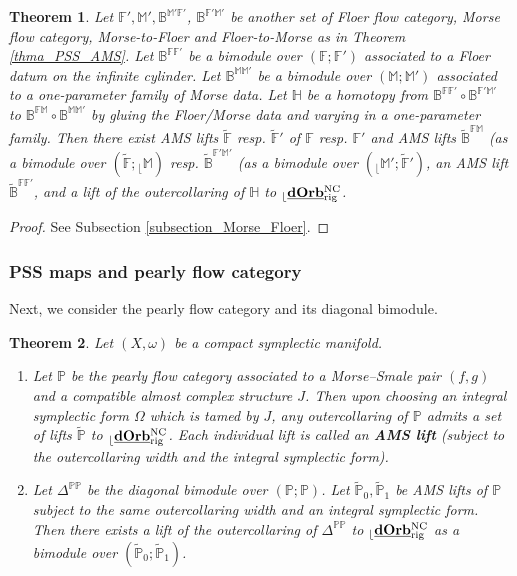 \documentclass[reqno, 10pt]{amsart}
\numberwithin{equation}{section}
\numberwithin{equation}{section}
\newtheorem{thm}{Theorem}[section]
\theoremstyle{definition}
\theoremstyle{remark}
\newcommand{\mb}{\mathbb}
\renewcommand{\outer}{{}_{\lfloor}}
\newcommand{\uds}[1]{\underline{\smash{#1}}}
\begin{document}
\begin{thm}\label{thm126}
Let ${\mb F}', {\mb M}', \mb{B}^{\mb{M}'\mb{F}'}$, $\mb{B}^{\mb{F}'\mb{M}'}$ be another set of Floer flow category, Morse flow category, Morse-to-Floer and Floer-to-Morse as in Theorem \ref{thma_PSS_AMS}. Let $\mb{B}^{\mb{FF}'}$ be a bimodule over $(\mb{F}; {\mb F}')$ associated to a Floer datum on the infinite cylinder. Let $\mb{B}^{\mb{MM}'}$ be a bimodule over $(\mb{M}; {\mb M}')$ associated to a one-parameter family of Morse data. Let ${\mb H}$ be a homotopy from $\mb{B}^{\mb{FF}'} \circ \mb{B}^{\mb{F}'\mb{M}'}$ to $\mb{B}^{\mb{FM}} \circ \mb{B}^{\mb{MM'}}$ by gluing the Floer/Morse data and varying in a one-parameter family. Then there exist AMS lifts $\tilde {\mb F}$ resp. $\tilde {\mb F}'$ of ${\mb F}$ resp. ${\mb F}'$ and AMS lifts $\tilde {\mb B}^{\mb{FM}}$ (as a bimodule over $(\tilde{\mb F}; \outer {\mb M})$ resp. $\tilde {\mb B}^{\mb{F}'{\mb M}'}$ (as a bimodule over $(\outer \mb{M}'; \tilde {\mb F}')$, an AMS lift $\tilde {\mb B}^{\mb{FF}'}$, and a lift of the outercollaring of ${\mb H}$ to $\outer \uds{\bf dOrb}_{\rm rig}^{\rm NC}$. 
\end{thm}

\begin{proof}
See Subsection \ref{subsection_Morse_Floer}.
\end{proof}


\subsubsection{PSS maps and pearly flow category}


Next, we consider the pearly flow category and its diagonal bimodule. 

\begin{thm}\label{thma_pearly_chart}
Let $(X, \omega)$ be a compact symplectic manifold. 
\begin{enumerate}

\item Let ${\mb P}$ be the pearly flow category associated to a Morse--Smale pair $(f, g)$ and a compatible almost complex structure $J$. Then upon choosing an integral symplectic form $\Omega$ which is tamed by $J$, any outercollaring of ${\mb P}$ admits a set of lifts $\tilde {\mb P}$ to $\outer \uds{\bf dOrb}_{\rm rig}^{\rm NC}$. Each individual lift is called an {\bf AMS lift} (subject to the outercollaring width and the integral symplectic form).


\item Let $\mb{\Delta}^{\mb{PP}}$ be the diagonal bimodule over $({\mb P}; {\mb P})$. Let $\tilde{\mb P}_0, \tilde {\mb P}_1$ be AMS lifts of ${\mb P}$ subject to the same outercollaring width and an integral symplectic form. Then there exists a lift of the outercollaring of $\mb{\Delta}^{\mb{PP}}$ to $\outer \uds{\bf dOrb}_{\rm rig}^{\rm NC}$ as a bimodule over $(\tilde {\mb P}_0; \tilde {\mb P}_1)$.
\end{enumerate}
\end{thm}
\end{document}
